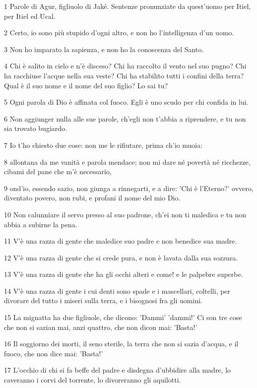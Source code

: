 \par 1 Parole di Agur, figliuolo di Jaké. Sentenze pronunziate da quest'uomo per Itiel, per Itiel ed Ucal.
\par 2 Certo, io sono più stupido d'ogni altro, e non ho l'intelligenza d'un uomo.
\par 3 Non ho imparato la sapienza, e non ho la conoscenza del Santo.
\par 4 Chi è salito in cielo e n'è disceso? Chi ha raccolto il vento nel suo pugno? Chi ha racchiuse l'acque nella sua veste? Chi ha stabilito tutti i confini della terra? Qual è il suo nome e il nome del suo figlio? Lo sai tu?
\par 5 Ogni parola di Dio è affinata col fuoco. Egli è uno scudo per chi confida in lui.
\par 6 Non aggiunger nulla alle sue parole, ch'egli non t'abbia a riprendere, e tu non sia trovato bugiardo.
\par 7 Io t'ho chiesto due cose: non me le rifiutare, prima ch'io muoia:
\par 8 allontana da me vanità e parola mendace; non mi dare né povertà né ricchezze, cibami del pane che m'è necessario,
\par 9 ond'io, essendo sazio, non giunga a rinnegarti, e a dire: 'Chi è l'Eterno?' ovvero, diventato povero, non rubi, e profani il nome del mio Dio.
\par 10 Non calunniare il servo presso al suo padrone, ch'ei non ti maledica e tu non abbia a subirne la pena.
\par 11 V'è una razza di gente che maledice suo padre e non benedice sua madre.
\par 12 V'è una razza di gente che si crede pura, e non è lavata dalla sua sozzura.
\par 13 V'è una razza di gente che ha gli occhi alteri e come! e le palpebre superbe.
\par 14 V'è una razza di gente i cui denti sono spade e i mascellari, coltelli, per divorare del tutto i miseri sulla terra, e i bisognosi fra gli uomini.
\par 15 La mignatta ha due figliuole, che dicono: 'Dammi' 'dammi!' Ci son tre cose che non si sazian mai, anzi quattro, che non dicon mai: 'Basta!'
\par 16 Il soggiorno dei morti, il seno sterile, la terra che non si sazia d'acqua, e il fuoco, che non dice mai: 'Basta!'
\par 17 L'occhio di chi si fa beffe del padre e disdegna d'ubbidire alla madre, lo caveranno i corvi del torrente, lo divoreranno gli aquilotti.
